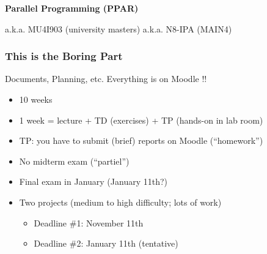\documentclass[10pt]{beamer}
\subtitle{Organisation}
\author[C. Bouillaguet]{\textbf{Charles Bouillaguet / Vincent Neiger}}
\institute[SU]{Sorbonne Université}
\date{PPAR}
\begin{document}

\begin{frame}
  
  \centering

  
  \vspace{1cm}
  
  \textbf{\Large Parallel Programming (PPAR)}

  \bigskip

  a.k.a. MU4I903 (university masters) a.k.a. N8-IPA (MAIN4)
\end{frame}


\begin{frame}
  \frametitle{This is the Boring Part}

  \begin{block}{Documents, Planning, etc.}
    Everything is on Moodle !!
  \end{block}
  
  \begin{itemize}
  \item 10 weeks
  \item 1 week = lecture + TD (exercises) + TP (hands-on in lab room)
  \item TP: you have to submit (brief) reports on Moodle (``homework'')
  \item No midterm exam (``partiel'')
  \item Final exam in January (January 11th?)
  \item Two projects (medium to high difficulty; lots of work)
    \begin{itemize}
    \item Deadline \#1: November 11th
    \item Deadline \#2: January 11th (tentative)
    \end{itemize}
  \end{itemize}
\end{frame}

\end{document}
